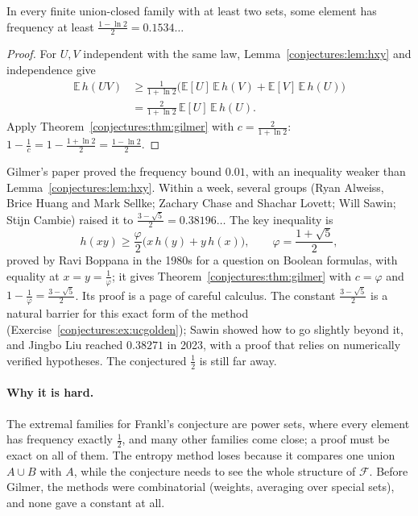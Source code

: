 \begin{corollary}\label{conjectures:cor:ucconst}
In every finite union-closed family with at least two sets, some element has frequency at least $\frac{1-\ln2}2=0.1534\ldots$
\end{corollary}
\begin{proof}
For $U,V$ independent with the same law, Lemma~\ref{conjectures:lem:hxy} and independence give
\[
\begin{aligned}\mathbb E\,h(UV)&\ge\frac1{1+\ln2}\bigl(\mathbb E[U]\,\mathbb E\,h(V)+\mathbb E[V]\,\mathbb E\,h(U)\bigr)\\&=\frac2{1+\ln2}\,\mathbb E[U]\,\mathbb E\,h(U).\end{aligned}
\]
Apply
Theorem~\ref{conjectures:thm:gilmer} with $c=\frac2{1+\ln2}$: $1-\frac1c=1-\frac{1+\ln2}2=\frac{1-\ln2}2$.
\end{proof}

\begin{remark}\label{conjectures:rem:ucrace}
Gilmer's paper proved the frequency bound $0.01$, with an inequality weaker than Lemma~\ref{conjectures:lem:hxy}. Within a week, several groups (Ryan Alweiss,
Brice Huang and Mark Sellke; Zachary Chase and Shachar Lovett; Will Sawin; Stijn Cambie) raised it to $\frac{3-\sqrt5}2=0.38196\ldots$ The key
inequality is
\[
h(xy)\ge\frac\varphi2\bigl(x\,h(y)+y\,h(x)\bigr),\qquad\varphi=\frac{1+\sqrt5}2,
\]
proved by Ravi Boppana in the 1980s for a question on Boolean formulas, with equality at $x=y=\frac1\varphi$; it gives Theorem~\ref{conjectures:thm:gilmer} with
$c=\varphi$ and $1-\frac1\varphi=\frac{3-\sqrt5}2$. Its proof is a page of careful calculus. The constant $\frac{3-\sqrt5}2$ is a natural barrier for
this exact form of the method (Exercise~\ref{conjectures:ex:ucgolden}); Sawin showed how to go slightly beyond it, and Jingbo Liu reached $0.38271$ in 2023, with a
proof that relies on numerically verified hypotheses. The conjectured $\frac12$ is still far away.
\end{remark}

\paragraph{Why it is hard.} The extremal families for Frankl's conjecture are power sets, where every element has frequency exactly $\frac12$, and many
other families come close; a proof must be exact on all of them. The entropy method loses because it compares one union $A\cup B$ with $A$, while the
conjecture needs to see the whole structure of $\mathcal F$. Before Gilmer, the methods were combinatorial (weights, averaging over special sets), and
none gave a constant at all.

